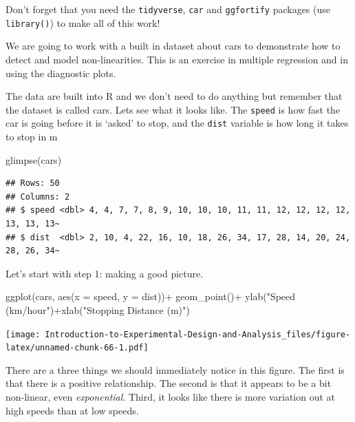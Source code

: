 \documentclass[
]{book}
\newenvironment{Shaded}{\begin{snugshade}}{\end{snugshade}}
\newcommand{\AttributeTok}[1]{\textcolor[rgb]{0.77,0.63,0.00}{#1}}
\newcommand{\FunctionTok}[1]{\textcolor[rgb]{0.00,0.00,0.00}{#1}}
\newcommand{\NormalTok}[1]{#1}
\newcommand{\SpecialCharTok}[1]{\textcolor[rgb]{0.00,0.00,0.00}{#1}}
\newcommand{\StringTok}[1]{\textcolor[rgb]{0.31,0.60,0.02}{#1}}
\begin{document}
Don't forget that you need the \texttt{tidyverse}, \texttt{car} and \texttt{ggfortify} packages (use \texttt{library()}) to make all of this work!

We are going to work with a built in dataset about cars to demonstrate how to detect and model non-linearities. This is an exercise in multiple regression and in using the diagnostic plots.

The data are built into R and we don't need to do anything but remember that the dataset is called cars. Lets see what it looks like. The \texttt{speed} is how fast the car is going before it is `asked' to stop, and the \texttt{dist} variable is how long it takes to stop in m

\begin{Shaded}
\begin{Highlighting}[]
\FunctionTok{glimpse}\NormalTok{(cars)}
\end{Highlighting}
\end{Shaded}

\begin{verbatim}
## Rows: 50
## Columns: 2
## $ speed <dbl> 4, 4, 7, 7, 8, 9, 10, 10, 10, 11, 11, 12, 12, 12, 12, 13, 13, 13~
## $ dist  <dbl> 2, 10, 4, 22, 16, 10, 18, 26, 34, 17, 28, 14, 20, 24, 28, 26, 34~
\end{verbatim}

Let's start with step 1: making a good picture.

\begin{Shaded}
\begin{Highlighting}[]
\FunctionTok{ggplot}\NormalTok{(cars, }\FunctionTok{aes}\NormalTok{(}\AttributeTok{x =}\NormalTok{ speed, }\AttributeTok{y =}\NormalTok{ dist))}\SpecialCharTok{+}
  \FunctionTok{geom\_point}\NormalTok{()}\SpecialCharTok{+}
  \FunctionTok{ylab}\NormalTok{(}\StringTok{"Speed (km/hour"}\NormalTok{)}\SpecialCharTok{+}\FunctionTok{xlab}\NormalTok{(}\StringTok{"Stopping Distance (m)"}\NormalTok{)}
\end{Highlighting}
\end{Shaded}

\texttt{[image: Introduction-to-Experimental-Design-and-Analysis\_files/figure-latex/unnamed-chunk-66-1.pdf]}

There are a three things we should immediately notice in this figure. The first is that there is a positive relationship. The second is that it appears to be a bit non-linear, even \emph{exponential}. Third, it looks like there is more variation out at high speeds than at low speeds.
\end{document}
